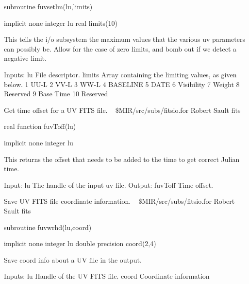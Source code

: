 \par{\tenpoint
{\eightpoint\begintt
        subroutine fuvsetlm(lu,limits)

        implicit none
        integer lu
        real limits(10)

  This tells the i/o subsystem the maximum values that the various
  uv parameters can possibly be. Allow for the case of zero limits,
  and bomb out if we detect a negative limit.

  Inputs:
    lu         File descriptor.
    limits     Array containing the limiting values, as given below.
               1  UU-L
               2  VV-L
               3  WW-L
               4  BASELINE
               5  DATE
               6  Visibility
               7  Weight
               8  Reserved
               9  Base Time
               10 Reserved
\endtt}
\par}
%
\noindent Get time offset for a UV FITS file.
\newline \ 
\newline {} \$MIR/src/subs/fitsio.for
\newline {} Robert Sault
\newline {} fits
\par{\tenpoint
{\eightpoint\begintt
        real function fuvToff(lu)

        implicit none
        integer lu

  This returns the offset that needs to be added to the time to get
  correct Julian time.

  Input:
    lu         The handle of the input uv file.
  Output:
    fuvToff    Time offset.
\endtt}
\par}
%
\noindent Save UV FITS file coordinate information.
\newline \ 
\newline {} \$MIR/src/subs/fitsio.for
\newline {} Robert Sault
\newline \abox{Keywords:} fits
\par{\tenpoint
{\eightpoint\begintt
        subroutine fuvwrhd(lu,coord)

        implicit none
        integer lu
        double precision coord(2,4)

  Save coord info about a UV file in the output.

  Inputs:
    lu         Handle of the UV FITS file.
    coord      Coordinate information
\endtt}
\par}
